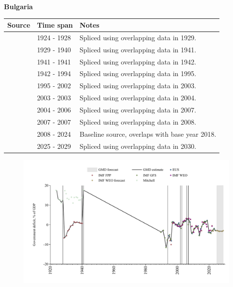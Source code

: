 \documentclass[12pt,a4paper,landscape]{article}
\begin{document}
\begin{adjustbox}{max totalsize={\paperwidth}{\paperheight},center}
\begin{minipage}[t][\textheight][t]{\textwidth}
\vspace*{0.5cm}
{}
\begin{center}
{\Large\bfseries Bulgaria}
\end{center}
\vspace{0.5cm}
\begin{table}[H]
\centering
\small
\begin{tabular}{|l|l|l|}
\hline
\textbf{Source} & \textbf{Time span} & \textbf{Notes} \\
\hline
\rowcolor{white}\cite{Mitchell}& 1924 - 1928 &Spliced using overlapping data in 1929.\\
\rowcolor{lightgray}\cite{IMF_FPP}& 1929 - 1940 &Spliced using overlapping data in 1941.\\
\rowcolor{white}\cite{Mitchell}& 1941 - 1941 &Spliced using overlapping data in 1942.\\
\rowcolor{lightgray}\cite{IMF_GFS}& 1942 - 1994 &Spliced using overlapping data in 1995.\\
\rowcolor{white}\cite{EUS}& 1995 - 2002 &Spliced using overlapping data in 2003.\\
\rowcolor{lightgray}\cite{IMF_WEO}& 2003 - 2003 &Spliced using overlapping data in 2004.\\
\rowcolor{white}\cite{EUS}& 2004 - 2006 &Spliced using overlapping data in 2007.\\
\rowcolor{lightgray}\cite{IMF_WEO}& 2007 - 2007 &Spliced using overlapping data in 2008.\\
\rowcolor{white}\cite{EUS}& 2008 - 2024 &Baseline source, overlaps with base year 2018.\\
\rowcolor{lightgray}\cite{IMF_WEO_forecast}& 2025 - 2029 &Spliced using overlapping data in 2030.\\
\hline
\end{tabular}
\end{table}
\begin{figure}[H]
\centering
\includegraphics[width=\textwidth,height=0.6\textheight,keepaspectratio]{graphs/BGR_govdef_GDP.pdf}
\end{figure}
\end{minipage}
\end{adjustbox}
\end{document}
